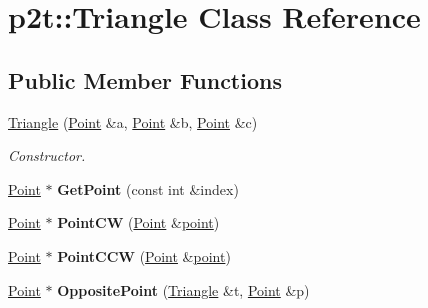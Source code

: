 \hypertarget{classp2t_1_1_triangle}{\section{p2t\+:\+:Triangle Class Reference}
\label{classp2t_1_1_triangle}
}
\subsection*{Public Member Functions}
\begin{DoxyCompactItemize}
\item 
\hypertarget{classp2t_1_1_triangle_ae5e05ccd7c0d899b4fdafd70c144d798}{\hyperlink{classp2t_1_1_triangle_ae5e05ccd7c0d899b4fdafd70c144d798}{Triangle} (\hyperlink{structp2t_1_1_point}{Point} \&a, \hyperlink{structp2t_1_1_point}{Point} \&b, \hyperlink{structp2t_1_1_point}{Point} \&c)}\label{classp2t_1_1_triangle_ae5e05ccd7c0d899b4fdafd70c144d798}

\begin{DoxyCompactList}\small\item\em Constructor. \end{DoxyCompactList}\item 
\hypertarget{classp2t_1_1_triangle_a4140c2c82b872b6964a4f93399698259}{\hyperlink{structp2t_1_1_point}{Point} $\ast$ {\bfseries Get\+Point} (const int \&index)}\label{classp2t_1_1_triangle_a4140c2c82b872b6964a4f93399698259}

\item 
\hypertarget{classp2t_1_1_triangle_a8f81a1a45e81f40fa4a0e6398a20ea5f}{\hyperlink{structp2t_1_1_point}{Point} $\ast$ {\bfseries Point\+C\+W} (\hyperlink{structp2t_1_1_point}{Point} \&\hyperlink{structpoint}{point})}\label{classp2t_1_1_triangle_a8f81a1a45e81f40fa4a0e6398a20ea5f}

\item 
\hypertarget{classp2t_1_1_triangle_a9978303e1284e9a2326eeb54a224ac22}{\hyperlink{structp2t_1_1_point}{Point} $\ast$ {\bfseries Point\+C\+C\+W} (\hyperlink{structp2t_1_1_point}{Point} \&\hyperlink{structpoint}{point})}\label{classp2t_1_1_triangle_a9978303e1284e9a2326eeb54a224ac22}

\item 
\hypertarget{classp2t_1_1_triangle_a4e92cc2061ab8bc0d3477acff2bc6377}{\hyperlink{structp2t_1_1_point}{Point} $\ast$ {\bfseries Opposite\+Point} (\hyperlink{classp2t_1_1_triangle}{Triangle} \&t, \hyperlink{structp2t_1_1_point}{Point} \&p)}\label{classp2t_1_1_triangle_a4e92cc2061ab8bc0d3477acff2bc6377}


\end{DoxyCompactItemize}
